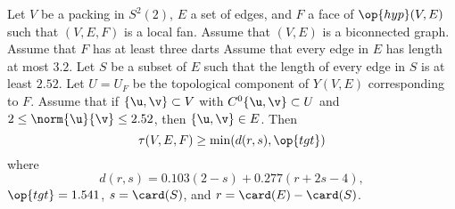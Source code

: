 \begin{theorem}\label{lemma:main-estimate-12} 
Let $V$ be a packing in $S^2(2)$, $E$ a set of edges, and $F$ a face of $\op{hyp}(V,E)$ such
that  $(V,E,F)$ is a local fan.
Assume that $(V,E)$ is a biconnected graph.  
Assume that  $F$ has at least three darts
Assume that  every edge in $E$ has
length at most $3.2$.
 Let $S$ be a subset of $E$ such that the length of every edge in $S$
is at least $2.52$.
Let $U=U_F$ be the topological
component of $Y(V,E)$ corresponding to $F$.
   Assume that if $\{\u,\v\}\subset V$ with
$C^0\{\u,\v\}\subset U$ and $2\le\norm{\u}{\v} \le 2.52$, then $\{\u,\v\}\in E$.
Then
\begin{displaymath}\tau(V,E,F) \ge \min(d(r,s),\op{tgt})\end{displaymath}
where 
\begin{displaymath}
d(r,s) = 0.103 (2-s) + 0.277 (r+2s-4),
\end{displaymath}
$\op{tgt}=1.541$, 
$s = \card(S)$, and $r = \card(E)-\card(S)$.
\end{theorem}

